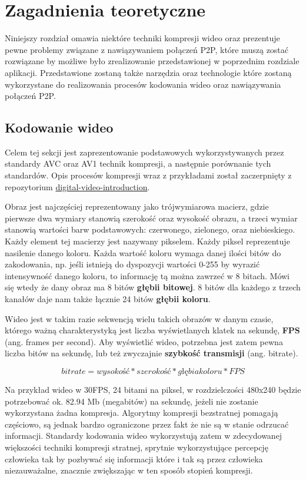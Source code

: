 \chapter{Zagadnienia teoretyczne}

Niniejszy rozdział omawia niektóre techniki kompresji wideo oraz prezentuje pewne problemy związane
z nawiązywaniem połączeń P2P, które muszą zostać rozwiązane by możliwe było zrealizowanie
przedstawionej w poprzednim rozdziale aplikacji. Przedstawione zostaną także narzędzia oraz
technologie które zostaną wykorzystane do realizowania procesów kodowania wideo oraz nawiązywania
połączeń P2P.

\section{Kodowanie wideo}

Celem tej sekcji jest zaprezentowanie podstawowych wykorzystywanych przez standardy AVC oraz AV1
technik kompresji, a następnie porównanie tych standardów.
Opis procesów kompresji wraz z przykładami został zaczerpnięty z repozytorium \href{https://github.com/leandromoreira/digital_video_introduction}{digital-video-introduction}\cite{digital_video_introduction}.

Obraz jest najczęściej reprezentowany jako trójwymiarowa macierz, gdzie pierwsze dwa wymiary
stanowią szerokość oraz wysokość obrazu, a trzeci wymiar stanowią wartości barw podstawowych:
czerwonego, zielonego, oraz niebieskiego. Każdy element tej macierzy jest nazywany pikselem. Każdy
piksel reprezentuje nasilenie danego koloru. Każda wartość koloru wymaga danej ilości bitów do
zakodowania, np. jeśli istnieją do dyspozycji wartości 0-255 by wyrazić intensywność danego koloru,
to informację tą można zawrzeć w 8 bitach. Mówi się wtedy że dany obraz ma 8 bitów \textbf{głębii
    bitowej}. 8 bitów dla każdego z trzech kanałów daje nam także łącznie 24 bitów \textbf{głębii
    koloru}.

Wideo jest w takim razie sekwencją wielu takich obrazów w danym czasie, którego ważną
charakterystyką jest liczba wyświetlanych klatek na sekundę, \textbf{FPS} (ang. frames per second).
Aby wyświetlić wideo, potrzebna jest zatem pewna liczba bitów na sekundę, lub też zwyczajnie
\textbf{szybkość transmisji} (ang. bitrate).

$$ bitrate = wysokość * szerokość * głębia koloru * FPS$$

Na przykład wideo w 30FPS, 24 bitami na piksel, w rozdzielczości 480x240 będzie potrzebować ok.
82.94 Mb (megabitów) na sekundę, jeżeli nie zostanie wykorzystana żadna kompresja. Algorytmy
kompresji bezstratnej pomagają częściowo, są jednak bardzo ograniczone przez fakt że nie są w stanie
odrzucać informacji. Standardy kodowania wideo wykorzystują zatem w zdecydowanej większości techniki
kompresji stratnej, sprytnie wykorzystujące percepcję człowieka tak by pozbywać się informacji które
i tak są przez człowieka niezauważalne, znacznie zwiększając w ten sposób stopień kompresji.

